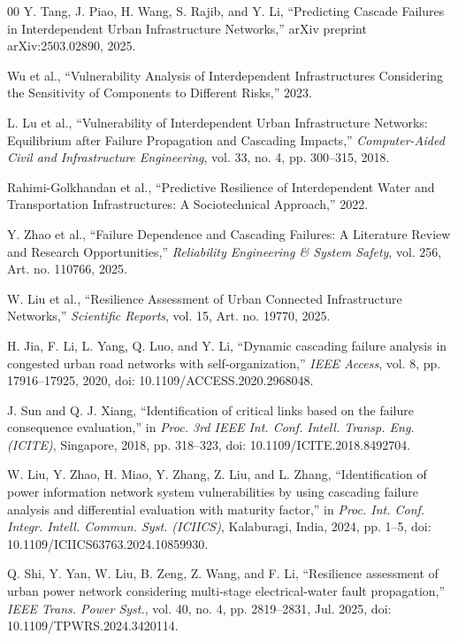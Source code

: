 \documentclass[oneside]{ieeeaccess}
\begin{document}
\begin{thebibliography}{00}
Y. Tang, J. Piao, H. Wang, S. Rajib, and Y. Li,
``Predicting Cascade Failures in Interdependent Urban Infrastructure Networks,''
arXiv preprint arXiv:2503.02890, 2025.

Wu et al.,
``Vulnerability Analysis of Interdependent Infrastructures Considering the Sensitivity of Components to Different Risks,''
2023.

L. Lu et al.,
``Vulnerability of Interdependent Urban Infrastructure Networks: Equilibrium after Failure Propagation and Cascading Impacts,''
\textit{Computer-Aided Civil and Infrastructure Engineering},
vol. 33, no. 4, pp. 300--315, 2018.

Rahimi-Golkhandan et al.,
``Predictive Resilience of Interdependent Water and Transportation Infrastructures: A Sociotechnical Approach,''
2022.

Y. Zhao et al.,
``Failure Dependence and Cascading Failures: A Literature Review and Research Opportunities,''
\textit{Reliability Engineering \& System Safety},
vol. 256, Art. no. 110766, 2025.

W. Liu et al.,
``Resilience Assessment of Urban Connected Infrastructure Networks,''
\textit{Scientific Reports},
vol. 15, Art. no. 19770, 2025.

H. Jia, F. Li, L. Yang, Q. Luo, and Y. Li, ``Dynamic cascading failure analysis in congested urban road networks with self-organization,'' \emph{IEEE Access}, vol. 8, pp. 17916--17925, 2020, doi: 10.1109/ACCESS.2020.2968048.

J. Sun and Q. J. Xiang, ``Identification of critical links based on the failure consequence evaluation,'' in \emph{Proc. 3rd IEEE Int. Conf. Intell. Transp. Eng. (ICITE)}, Singapore, 2018, pp. 318--323, doi: 10.1109/ICITE.2018.8492704.

W. Liu, Y. Zhao, H. Miao, Y. Zhang, Z. Liu, and L. Zhang, ``Identification of power information network system vulnerabilities by using cascading failure analysis and differential evaluation with maturity factor,'' in \emph{Proc. Int. Conf. Integr. Intell. Commun. Syst. (ICIICS)}, Kalaburagi, India, 2024, pp. 1--5, doi: 10.1109/ICIICS63763.2024.10859930.

Q. Shi, Y. Yan, W. Liu, B. Zeng, Z. Wang, and F. Li, ``Resilience assessment of urban power network considering multi-stage electrical-water fault propagation,'' \emph{IEEE Trans. Power Syst.}, vol. 40, no. 4, pp. 2819--2831, Jul. 2025, doi: 10.1109/TPWRS.2024.3420114.


\end{thebibliography}
\end{document}
